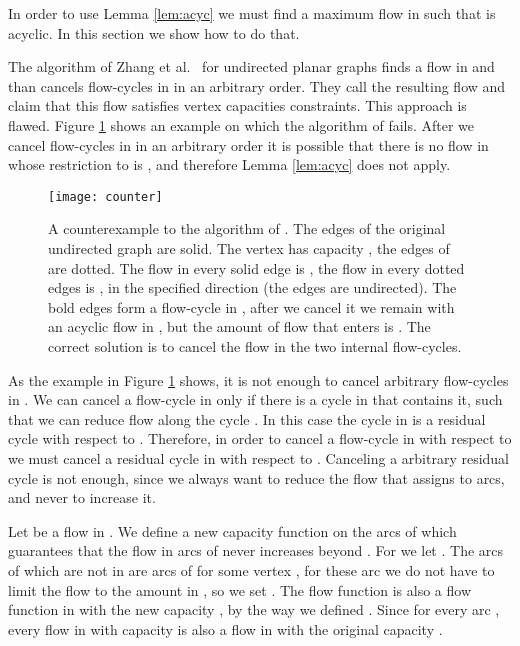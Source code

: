 \documentclass[a4paper,11pt]{article}
\begin{document}
In order to use Lemma \ref{lem:acyc} we must find a maximum flow  in 
such that  is acyclic. In this section we show how to do
that.

The algorithm of Zhang et al.~\cite[Section 3]{ZLC08} for undirected planar
graphs finds a flow  in  and than cancels flow-cycles  in
 in an arbitrary order. They call the resulting flow 
and claim that this flow satisfies vertex capacities constraints.
This approach is flawed.  Figure \ref{fig:counter} shows an example
on which the algorithm of \cite{ZLC08} fails. After we cancel
flow-cycles in  in an arbitrary order it is possible that
there is no flow  in  whose restriction to  is ,
and  therefore Lemma \ref{lem:acyc} does not apply.

\begin{figure}
    \centering
    \texttt{[image: counter]}
    \caption{A counterexample to the algorithm of \cite{ZLC08}.
    The edges of the original undirected graph  are solid. The vertex  has capacity , the edges of  are dotted.
     The flow in every solid edge is , the flow in every dotted edges is , in the specified direction (the edges are undirected). The bold edges form a flow-cycle in , after we cancel it we remain with an acyclic flow in , but the amount of flow that enters  is . The correct solution is to cancel the flow in the two internal flow-cycles.}
    \label{fig:counter}
\end{figure}

As the example in Figure \ref{fig:counter} shows, it is not enough
to cancel arbitrary flow-cycles in . We can cancel a flow-cycle
in  only if there is a cycle  in  that contains it, such that
we can reduce flow along the cycle . In this case the cycle  in 
is a residual cycle with respect to . Therefore, in order to cancel a
flow-cycle in  with respect to  we must cancel a residual cycle in
 with respect to . Canceling a arbitrary residual cycle is not enough,
since we always want to reduce the flow that  assigns to arcs, and never
to increase it.

Let  be a flow in . We define a new capacity function  on the
arcs of  which guarantees that the flow in arcs of  never increases
beyond .
For  we let . The arcs of  which are not in 
are arcs of  for some vertex , for these arc we do not have to limit
the flow to the amount in , so we set . The flow
function  is also a flow function in  with the new capacity , by
the way we defined . Since  for every arc , every
flow in  with capacity  is also a flow in  with the original
capacity .
\end{document}
